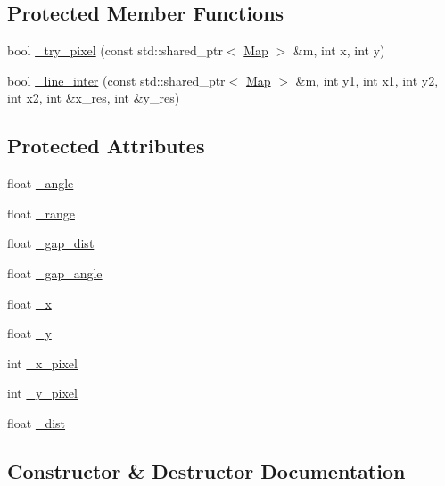 \subsection*{Protected Member Functions}
\begin{DoxyCompactItemize}
\item 
bool \hyperlink{classfastsim_1_1_laser_ac52f570ada4b3e29c234ddf57a9bfb25}{\+\_\+try\+\_\+pixel} (const std\+::shared\+\_\+ptr$<$ \hyperlink{classfastsim_1_1_map}{Map} $>$ \&m, int x, int y)
\item 
bool \hyperlink{classfastsim_1_1_laser_a6b11224a82236f9503fa828634230bd5}{\+\_\+line\+\_\+inter} (const std\+::shared\+\_\+ptr$<$ \hyperlink{classfastsim_1_1_map}{Map} $>$ \&m, int y1, int x1, int y2, int x2, int \&x\+\_\+res, int \&y\+\_\+res)
\end{DoxyCompactItemize}
\subsection*{Protected Attributes}
\begin{DoxyCompactItemize}
\item 
float \hyperlink{classfastsim_1_1_laser_a7e93560d02b262348821b19544257e37}{\+\_\+angle}
\item 
float \hyperlink{classfastsim_1_1_laser_ab5815631c5c18cab82ac98ba65ba83a2}{\+\_\+range}
\item 
float \hyperlink{classfastsim_1_1_laser_af5ba6001e76038df3953071a9c271b51}{\+\_\+gap\+\_\+dist}
\item 
float \hyperlink{classfastsim_1_1_laser_a7f36e2fabf7de51172253e096623b836}{\+\_\+gap\+\_\+angle}
\item 
float \hyperlink{classfastsim_1_1_laser_a5a6a79ca9ec93cdc7940c9168ad7dc38}{\+\_\+x}
\item 
float \hyperlink{classfastsim_1_1_laser_aee8f35be16f0de5bb36812d2508e7d36}{\+\_\+y}
\item 
int \hyperlink{classfastsim_1_1_laser_ad35031c338de0e0312b9fdd5356aaca9}{\+\_\+x\+\_\+pixel}
\item 
int \hyperlink{classfastsim_1_1_laser_a2e07a5246699632a0de91cb3ed6932d9}{\+\_\+y\+\_\+pixel}
\item 
float \hyperlink{classfastsim_1_1_laser_a3c06fa44047949d1ead472df4a249ea6}{\+\_\+dist}
\end{DoxyCompactItemize}


\subsection{Constructor \& Destructor Documentation}
